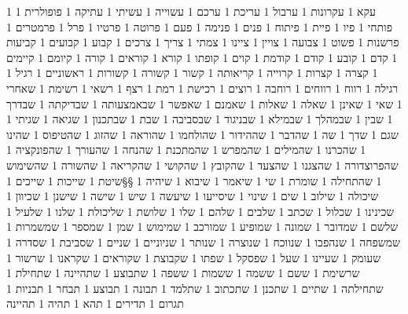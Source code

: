       1 עקא
      1 עקרונות
      1 ערבול
      1 עריכת
      1 ערכם
      1 עשוייה
      1 עשיתי
      1 עתיקה
      1 פופולרית
      1 פותחי
      1 פיו
      1 פיית
      1 פיתוח
      1 פנים
      1 פנימה
      1 פעם
      1 פרוטה
      1 פרטיו
      1 פרל
      1 פרמטרים
      1 פרשנות
      1 פשוט
      1 צבועה
      1 צויין
      1 ציינו
      1 צמתי
      1 צריך
      1 צרכים
      1 קבוע
      1 קבועים
      1 קביעות
      1 קדם
      1 קובע
      1 קודם
      1 קודמת
      1 קוים
      1 קופתו
      1 קורא
      1 קוראים
      1 קורה
      1 קיומם
      1 קיימים
      1 קצרה
      1 קצרות
      1 קרוייה
      1 קריאותה
      1 קשור
      1 קשורה
      1 קשורות
      1 ראשוניים
      1 רגיל
      1 רגילה
      1 רווח
      1 רווחים
      1 רוחבה
      1 רוצים
      1 רכישת
      1 רמת
      1 רצף
      1 רשאי
      1 רשימת
      1 שאחרי
      1 שאי
      1 שאינן
      1 שאלה
      1 שאלות
      1 שאמנם
      1 שאפשר
      1 שבאמצעותה
      1 שבדיקתה
      1 שבדרך
      1 שבין
      1 שבמהלך
      1 שבמילא
      1 שבניגוד
      1 שבסביבה
      1 שבת
      1 שבתכנון
      1 שגיאה
      1 שגיתי
      1 שגם
      1 שדך
      1 שה
      1 שהדבר
      1 שההידור
      1 שהולחמו
      1 שהוראה
      1 שהזוג
      1 שהטיפוס
      1 שהינו
      1 שהכרנו
      1 שהמילים
      1 שהמפרש
      1 שהמתכנת
      1 שהנחה
      1 שהעורך
      1 שהפונקציה
      1 שהפרוצדורה
      1 שהצגנו
      1 שהצעד
      1 שהקובץ
      1 שהקושי
      1 שהקריאה
      1 שהשורה
      1 שהשימוש
      1 שהתחילה
      1 שומרת
      1 שי
      1 שיאמר
      1 שיבוא
      1 שיהיה
      1 §§שיטת
      1 שייכות
      1 שייכים
      1 שיכולה
      1 שילוב
      1 שים
      1 שינוי
      1 שיסייעו
      1 שיעשה
      1 שיש
      1 שישה
      1 שישנן
      1 שכיוון
      1 שכינינו
      1 שכלול
      1 שכתב
      1 שלבים
      1 שלהם
      1 שלו
      1 שלושת
      1 שליכולת
      1 שלנו
      1 שלעיל
      1 שלשם
      1 שמדובר
      1 שמונה
      1 שמופיע
      1 שמורכב
      1 שמימוש
      1 שמן
      1 שמספר
      1 שמשמרות
      1 שמשפחה
      1 שנהפכו
      1 שנווכח
      1 שנוצרה
      1 שנותר
      1 שניוניים
      1 שניים
      1 שסביבת
      1 שסדרה
      1 שעומק
      1 שעיינו
      1 שעל
      1 שפסקל
      1 שפתו
      1 שקבוצת
      1 שקוראים
      1 שקראנו
      1 שרשור
      1 שרשימת
      1 ששם
      1 ששמה
      1 ששמות
      1 ששפה
      1 שתבוצע
      1 שתהיינה
      1 שתחילת
      1 שתחילתה
      1 שתיים
      1 שתכנן
      1 שתכתוב
      1 שתלמד
      1 תבונה
      1 תבוצע
      1 תבחר
      1 תבניות
      1 תגרום
      1 תדירים
      1 תהא
      1 תהיה
      1 תהיינה
